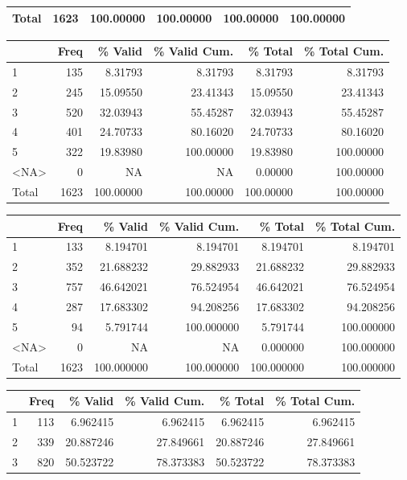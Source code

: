 \documentclass[
  letterpaper,
  DIV=11,
  numbers=noendperiod]{scrartcl}
\begin{document}
\begin{table}
\begin{tabular}[t]{l|r|r|r|r|r}
\hline
Total & 1623 & 100.00000 & 100.00000 & 100.00000 & 100.00000\\
\hline
\end{tabular}
\centering
\begin{tabular}[t]{l|r|r|r|r|r}
\hline
  & Freq & \% Valid & \% Valid Cum. & \% Total & \% Total Cum.\\
\hline
1 & 135 & 8.31793 & 8.31793 & 8.31793 & 8.31793\\
\hline
2 & 245 & 15.09550 & 23.41343 & 15.09550 & 23.41343\\
\hline
3 & 520 & 32.03943 & 55.45287 & 32.03943 & 55.45287\\
\hline
4 & 401 & 24.70733 & 80.16020 & 24.70733 & 80.16020\\
\hline
5 & 322 & 19.83980 & 100.00000 & 19.83980 & 100.00000\\
\hline
<NA> & 0 & NA & NA & 0.00000 & 100.00000\\
\hline
Total & 1623 & 100.00000 & 100.00000 & 100.00000 & 100.00000\\
\hline
\end{tabular}
\centering
\begin{tabular}[t]{l|r|r|r|r|r}
\hline
  & Freq & \% Valid & \% Valid Cum. & \% Total & \% Total Cum.\\
\hline
1 & 133 & 8.194701 & 8.194701 & 8.194701 & 8.194701\\
\hline
2 & 352 & 21.688232 & 29.882933 & 21.688232 & 29.882933\\
\hline
3 & 757 & 46.642021 & 76.524954 & 46.642021 & 76.524954\\
\hline
4 & 287 & 17.683302 & 94.208256 & 17.683302 & 94.208256\\
\hline
5 & 94 & 5.791744 & 100.000000 & 5.791744 & 100.000000\\
\hline
<NA> & 0 & NA & NA & 0.000000 & 100.000000\\
\hline
Total & 1623 & 100.000000 & 100.000000 & 100.000000 & 100.000000\\
\hline
\end{tabular}
\centering
\begin{tabular}[t]{l|r|r|r|r|r}
\hline
  & Freq & \% Valid & \% Valid Cum. & \% Total & \% Total Cum.\\
\hline
1 & 113 & 6.962415 & 6.962415 & 6.962415 & 6.962415\\
\hline
2 & 339 & 20.887246 & 27.849661 & 20.887246 & 27.849661\\
\hline
3 & 820 & 50.523722 & 78.373383 & 50.523722 & 78.373383\\

\end{tabular}
\end{table}
\end{document}
